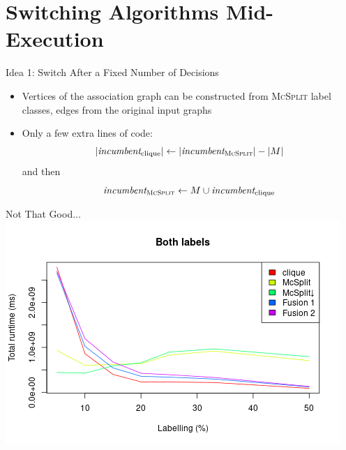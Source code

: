 \documentclass{beamer}
\begin{document}
\section{Switching Algorithms Mid-Execution}


\begin{frame}{Idea 1: Switch After a Fixed Number of Decisions}
  \pause
  \begin{itemize}
  \item Vertices of the association graph can be constructed from \textsc{McSplit}
    label classes, edges from the original input graphs
  \item Only a few extra lines of code:
    \[ |\textit{incumbent}_{\text{clique}}| \gets
      |\textit{incumbent}_{\text{\textsc{McSplit}}}| - |M| \]
    and then
    \[ \textit{incumbent}_{\textsc{McSplit}} \gets
      M \cup \textit{incumbent}_{\text{clique}} \]
  \end{itemize}
\end{frame}

\begin{frame}{Not That Good...}
  \centering
  \includegraphics[scale=0.5]{../dissertation/images/fusion_linechart.png}
\end{frame}
\end{document}
